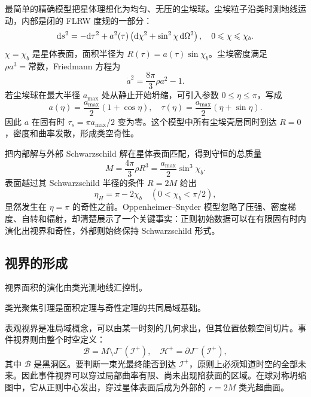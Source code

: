最简单的精确模型把星体理想化为均匀、无压的尘埃球。尘埃粒子沿类时测地线运动，内部是闭的 FLRW 度规的一部分：
\[
    \dd s^2=-\dd\tau^2+a^2(\tau)
    \left(\dd\chi^2+\sin^2\chi\,\dd\Omega^2\right),
    \quad 0\leqslant\chi\leqslant\chi_b.
\]
$\chi=\chi_b$ 是星体表面，面积半径为 $R(\tau)=a(\tau)\sin\chi_b$。尘埃密度满足 $\rho a^3=\text{常数}$，Friedmann 方程为
\[
    \dot a^2=\frac{8\pi}{3}\rho a^2-1.
\]
若尘埃球在最大半径 $a_{\max}$ 处从静止开始坍缩，可引入参数 $0\leqslant\eta\leqslant\pi$，写成
\[
    a(\eta)=\frac{a_{\max}}{2}(1+\cos\eta),\quad
    \tau(\eta)=\frac{a_{\max}}{2}(\eta+\sin\eta).
\]
因此 $a$ 在固有时 $\tau_s=\pi a_{\max}/2$ 变为零。这个模型中所有尘埃壳层同时到达 $R=0$，密度和曲率发散，形成类空奇性。

把内部解与外部 Schwarzschild 解在星体表面匹配，得到守恒的总质量
\[
    M=\frac{4\pi}{3}\rho R^3
     =\frac{a_{\max}}{2}\sin^3\chi_b.
\]
表面越过其 Schwarzschild 半径的条件 $R=2M$ 给出
\[
    \eta_H=\pi-2\chi_b\quad(0<\chi_b<\pi/2),
\]
显然发生在 $\eta=\pi$ 的奇性之前。Oppenheimer--Snyder 模型忽略了压强、密度梯度、自转和辐射，却清楚展示了一个关键事实：正则初始数据可以在有限固有时内演化出视界和奇性，外部则始终保持 Schwarzschild 形式。

\subsection{视界的形成}

视界面积的演化由类光测地线汇控制。

类光聚焦引理是面积定理与奇性定理的共同局域基础。

表观视界是准局域概念，可以由某一时刻的几何求出，但其位置依赖空间切片。事件视界则由整个时空定义：
\[
    \mathcal B=M\setminus J^-(\mathscr I^+),\quad
    \mathcal H^+=\partial J^-(\mathscr I^+),
\]
其中 $\mathcal B$ 是黑洞区。要判断一束光最终能否到达 $\mathscr I^+$，原则上必须知道时空的全部未来。因此事件视界可以穿过局部曲率有限、尚未出现陷获面的区域。在球对称坍缩图中，它从正则中心发出，穿过星体表面后成为外部的 $r=2M$ 类光超曲面。

